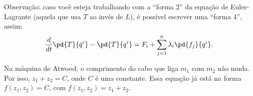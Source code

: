 \begin{question}
  	\bigskip
  	\begin{compactdesc}
  		\item[Observação:] caso você esteja trabalhando com a ``forma 2'' da equação de Euler-Lagrante (aquela que usa $T$ ao invés de $L$), é possível escrever uma ``forma 4'', assim:
  		\begin{equation*}
  			\frac{d}{dt}\pd{T}{\dot q^i} - \pd{T}{q^i} = F_i + \sum_{j = 1}^{n} \lambda_i \pd{f_j}{q^i}.
  		\end{equation*}
  	\end{compactdesc}

    \begin{solution}
      Na máquina de Atwood, o comprimento do cabo que liga $m_1$ com $m_2$ não muda.
      Por isso, $z_1 + z_2 = C$, onde $C$ é uma constante.
      Essa equação já está na forma $f(z_1, z_2) = C$, com $f(z_1, z_2) = z_1 + z_2$.
    \end{solution}
\end{question}
